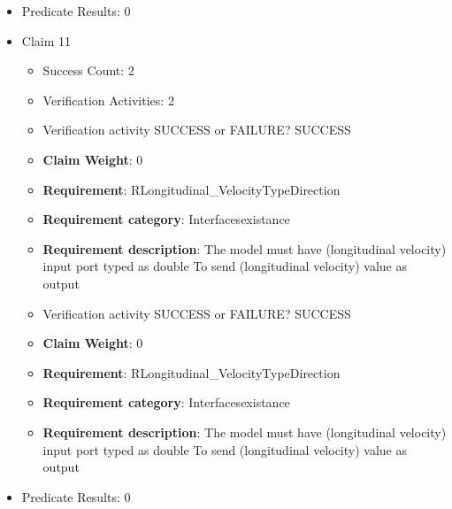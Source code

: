 \documentclass{article}
\begin{document}
\begin{itemize}
\begin{itemize}
					\item Verification activity SUCCESS or FAILURE? SUCCESS
					\item \textbf{Claim Weight}: 0
						\item \textbf{Requirement}: RWheelsElevationTypeDirection 
						\item \textbf{Requirement category}: Interfacesexistance 
						\item \textbf{Requirement description}: The model must have (wheels elevation) input port typed as boolean To get (wheels elevation) value as input
					
				\end{itemize}
				
									    
				\item Predicate Results: 0

  				  \item Claim 11
				\begin{itemize}
			    	\item Success Count: 2 
			    	\item Verification Activities: 2
					\item Verification activity SUCCESS or FAILURE? SUCCESS
					\item \textbf{Claim Weight}: 0
						\item \textbf{Requirement}: RLongitudinal_VelocityTypeDirection 
						\item \textbf{Requirement category}: Interfacesexistance 
						\item \textbf{Requirement description}: The model must have (longitudinal velocity) input port typed as double To send (longitudinal velocity) value as output
					
					\item Verification activity SUCCESS or FAILURE? SUCCESS
					\item \textbf{Claim Weight}: 0
						\item \textbf{Requirement}: RLongitudinal_VelocityTypeDirection 
						\item \textbf{Requirement category}: Interfacesexistance 
						\item \textbf{Requirement description}: The model must have (longitudinal velocity) input port typed as double To send (longitudinal velocity) value as output
					
				\end{itemize}
				
									    
				\item Predicate Results: 0


\end{itemize}
\end{document}
